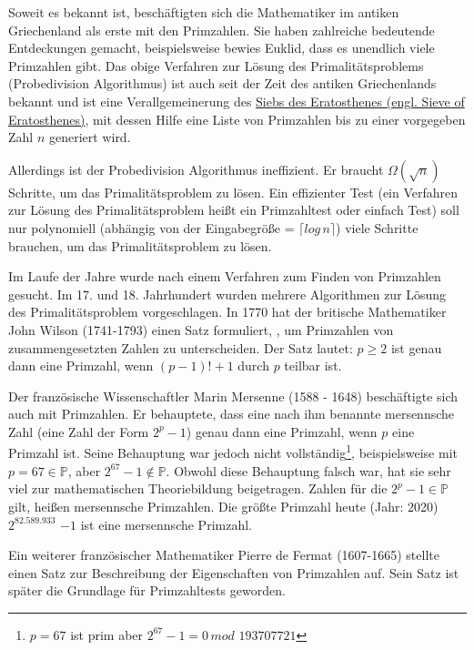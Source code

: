 \documentclass[12pt,oneside]{article}
\theoremstyle{remark}
\theoremstyle{definition}
\begin{document}
Soweit es bekannt ist, beschäftigten sich die Mathematiker im antiken Griechenland als erste mit den Primzahlen. Sie haben zahlreiche bedeutende Entdeckungen gemacht, beispielsweise bewies Euklid, dass es unendlich viele Primzahlen gibt\cite{primeNums}. Das obige Verfahren zur Lösung des Primalitätsproblems (Probedivision Algorithmus) ist auch seit der Zeit des antiken Griechenlands bekannt und ist eine Verallgemeinerung des \href{https://en.wikipedia.org/wiki/Sieve_of_Eratosthenes}{Siebs des Eratosthenes (engl. Sieve of Eratosthenes)}, mit dessen Hilfe eine Liste von Primzahlen bis zu einer vorgegeben Zahl $n$ generiert wird.

Allerdings ist der Probedivision Algorithmus ineffizient. Er braucht $\Omega(\sqrt{n})$ Schritte, um das Primalitätsproblem zu lösen. Ein effizienter Test (ein Verfahren zur Lösung des Primalitätsproblem heißt ein Primzahltest oder einfach Test) soll nur polynomiell (abhängig von der Eingabegröße = $\lceil log \, n \rceil$) viele Schritte brauchen, um das Primalitätsproblem zu lösen.


Im Laufe der Jahre wurde nach einem Verfahren zum Finden von Primzahlen gesucht. Im 17. und 18. Jahrhundert wurden mehrere Algorithmen zur Lösung des Primalitätsproblem vorgeschlagen. In 1770 hat der britische Mathematiker John Wilson (1741-1793) einen Satz formuliert, , um Primzahlen von zusammengesetzten Zahlen zu unterscheiden. Der Satz lautet: $p \geq 2$ ist genau dann eine Primzahl, wenn $(p - 1)! + 1$ durch $p$ teilbar ist.

Der französische Wissenschaftler Marin Mersenne (1588 - 1648) beschäftigte sich auch mit Primzahlen. Er behauptete, dass eine nach ihm benannte mersennsche Zahl (eine Zahl der Form $2^p - 1$) genau dann eine Primzahl, wenn $p$ eine Primzahl ist. Seine Behauptung war jedoch nicht vollständig\footnote{$p = 67$ ist prim aber $2^{67} - 1 = 0 \, mod \, \, 193707721$}, beispielsweise mit $ p = 67 \in \mathbb{P}$, aber $2^{67} - 1 \not \in \mathbb{P}$. Obwohl diese Behauptung falsch war, hat sie sehr viel zur mathematischen Theoriebildung beigetragen. Zahlen für die $2^p - 1 \in \mathbb{P}$ gilt, heißen mersennsche Primzahlen. Die größte Primzahl heute (Jahr: 2020) $2^{82.589.933}$ $ - 1$ ist eine mersennsche Primzahl\cite{largePrimes}.

Ein weiterer französischer Mathematiker Pierre de Fermat (1607-1665) stellte einen Satz zur Beschreibung der Eigenschaften von Primzahlen auf. Sein Satz ist später die Grundlage für Primzahltests geworden.\newline
\end{document}
